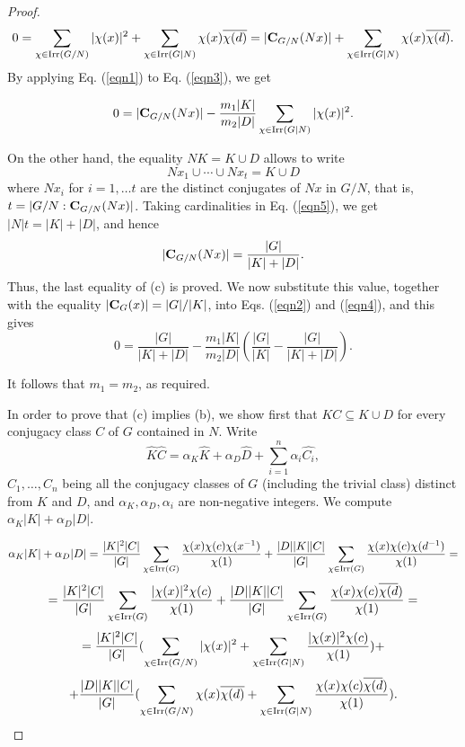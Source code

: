 \documentclass[12pt,leqno,a4paper]{amsart}
\numberwithin{equation}{section}
\begin{document}
\begin{proof}
\begin{equation} 0=\sum_{\chi\in {\rm Irr}(G/N)} |\chi(x)|^2
+ \sum_{\chi\in {\rm Irr}(G|N)}
 \chi(x)\overline{\chi(d)} =
|{\bf C}_{G/N}(Nx)| + \sum_{\chi\in {\rm Irr}(G|N)} \chi(x)\overline{\chi(d)}. \label{eqn3}
 \end{equation}
By applying Eq. (\ref{eqn1}) to Eq. (\ref{eqn3}), we get




\begin{equation}\label{eqn4}
0=|{\bf C}_{G/N}(Nx)| - \frac{m_1|K|}{m_2|D|}\sum_{\chi\in {\rm Irr}(G|N)}
 |\chi(x)|^2.
 \end{equation}

\noindent
On the other hand, the  equality $NK=K \cup D$ allows to write
\begin{equation}
Nx_1\cup \cdots \cup Nx_t= K\cup D \label{eqn5}
\end{equation}
where $Nx_i$ for $i=1,\ldots t$ are the distinct conjugates of $Nx$  in $G/N$, that is, $t=|G/N:{\bf C}_{G/N}(Nx)|$. Taking cardinalities in Eq. (\ref{eqn5}), we get $|N|t= |K|+ |D|$, and hence
$$|{\bf C}_{G/N}(Nx)|=  \frac{|G|}{|K|+ |D|}.$$
Thus, the last equality of (c) is proved.
We now substitute this value, together with the equality $|{\bf C}_G(x)|=|G|/|K|$, into  Eqs. (\ref{eqn2}) and (\ref{eqn4}),  and this gives
$$0= \frac{|G|}{|K|+ |D|}-\frac{m_1|K|}{m_2|D|}\left(\frac{|G|}{|K|}-\frac{|G|}{|K|+ |D|}\right).$$

\noindent
It follows that $m_1=m_2$, as required.

\medskip
In order to prove that (c) implies (b), we show first that $KC\subseteq K\cup D$ for every conjugacy class $C$ of $G$ contained in $N$. Write
 \begin{equation}\label{eqn6}
 \widehat{K}\widehat{C}=\alpha_K\widehat{K}+\alpha_D\widehat{D} + \sum_{i=1}^n \alpha_i \widehat{C_i},
 \end{equation}
 $C_1, \ldots , C_n$ being  all the conjugacy classes of $G$ (including the trivial class) distinct from $K$ and $D$, and $\alpha_K,\alpha_D, \alpha_i$ are non-negative integers. We compute  $\alpha_K|K| + \alpha_D|D|$.

 $$ \alpha_K|K| + \alpha_D|D|=\frac{|K|^2|C|}{|G|}\sum_{\chi\in {\rm Irr}(G)}\frac{\chi(x)\chi(c)\chi(x^{-1})}{\chi(1)}+
 \frac{|D||K||C|}{|G|}\sum_{\chi\in {\rm Irr}(G)}\frac{\chi(x)\chi(c)\chi(d^{-1})}{\chi(1)}=$$
 $$=\frac{|K|^2|C|}{|G|}\sum_{\chi\in {\rm Irr}(G)}\frac{|\chi(x)|^2\chi(c)}{\chi(1)}+
 \frac{|D||K||C|}{|G|}\sum_{\chi\in {\rm Irr}(G)}\frac{\chi(x)\chi(c)\overline{\chi(d})}{\chi(1)}= $$
 $$=\frac{|K|^2|C|}{|G|}(\sum_{\chi\in {\rm Irr}(G/N)}|\chi(x)|^2 + \sum_{\chi\in {\rm Irr}(G|N)}\frac{|\chi(x)|^2\chi(c)}{\chi(1)}) +$$
 $$+  \frac{|D||K||C|}{|G|}(\sum_{\chi\in {\rm Irr}(G/N)} \chi(x)\overline{\chi(d)} + \sum_{\chi\in {\rm Irr}(G|N)}\frac{\chi(x)\chi(c)\overline{\chi(d})}{\chi(1)}).$$


\end{proof}
\end{document}
